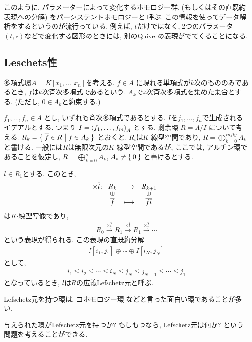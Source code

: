 \begin{remark}
  このように, パラメーターによって変化するホモロジー群,
  (もしくはその直既約表現への分解)
  をパーシステントホモロジーと
  呼ぶ.
  この情報を使ってデータ解析をするというのが流行っている.
  例えば, $t$だけではなく,
  2つのパラメータ$(t,s)$などで変化する図形のときには,
  別のQuiverの表現がでてくることになる.  
\end{remark}


\subsection{Leschets性}
多項式環$A=K[x_1,\ldots,x_n]$を考える.
$f\in A$ 
に現れる単項式が$k$次のもののみであるとき,
$f$は$k$次斉次多項式であるという.
$A_k$で$k$次斉次多項式を集めた集合とする.
(ただし, $0\in A_k$と約束する.)

$f_1,\ldots, f_n\in A$
とし, いずれも斉次多項式であるとする.
$I$を$f_1,\ldots, f_n$で生成されるイデアルとする.
つまり
$I=\Braket{f_1,\ldots,f_m}_{A}$
とする.
剰余環
$R=A/I$
について考える.
$R_k=\Set{\overline{f}\in R|f\in A_k}$
とおくと,
$R_i$は$K$-線型空間であり,
$R=\bigoplus_{k=0}^{infty}A_k$
と書ける.
一般には$R$は無限次元の$K$-線型空間であるが,
ここでは,
アルチン環であることを仮定し,
$R=\bigoplus_{k=0}^{s}A_k$, $A_s\neq \Set{0}$
と書けるとする.

$\overline{l}\in R_1$とする.
このとき,
\begin{align*}
  \times \overline{l}\colon
  \Shazo{R_{k}}{R_{k+1}}{\overline{f}}{\overline{fl}}
\end{align*}
は$K$-線型写像であり,
\begin{align*}
  R_0\xrightarrow{\times\overline{l}}
  R_1\xrightarrow{\times\overline{l}}
  R_1\xrightarrow{\times\overline{l}}\cdots
\end{align*}
という表現が得られる.
この表現の直既約分解
\begin{align*}
  I[i_1,j_1]\oplus \cdots\oplus I[i_N,j_N]
\end{align*}
として,
\begin{align*}
  i_1\leq i_2 \leq \cdots\leq i_N \leq j_N \leq j_{N-1} \leq \cdots \leq j_1
\end{align*}
となっているとき,
$\overline{l}$は$R$の広義Lefschetz元と呼ぶ.

Lefschetz元を持つ環は,
コホモロジー環
などと言った面白い環であることが多い.

与えられた環がLefschetz元を持つか?
もしもつなら, Lefschetz元は何か?
という問題を考えることができる.

